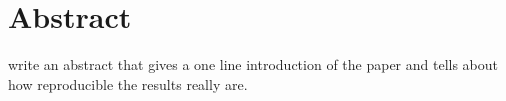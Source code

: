 \section{Abstract}
write an abstract that gives a one line introduction of the paper and tells about how reproducible the results really are. 
